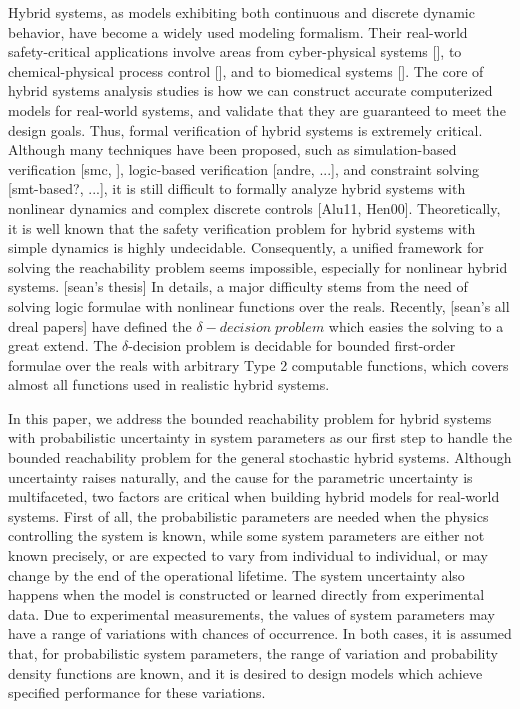 \documentclass[runningheads,a4paper]{llncs}
\begin{document}
Hybrid systems, as models exhibiting both continuous and discrete dynamic behavior, have become a widely used modeling formalism. Their real-world safety-critical applications involve areas from cyber-physical systems [], to chemical-physical process control [], and to biomedical systems []. The core of hybrid systems analysis studies is how we can construct accurate computerized models for real-world systems, and validate that they are guaranteed to meet the design goals. Thus, formal verification of hybrid systems is extremely critical. Although many techniques have been proposed, such as simulation-based verification [smc, ], logic-based verification [andre, ...], and constraint solving [smt-based?, ...], it is still difficult to formally analyze hybrid systems with nonlinear dynamics and complex discrete controls [Alu11, Hen00]. Theoretically, it is well known that the safety verification problem for hybrid systems with simple dynamics is highly undecidable. Consequently, a unified framework for solving the reachability problem seems impossible, especially for nonlinear hybrid systems. [sean's thesis] In details, a major difficulty stems from the need of solving logic formulae with nonlinear functions over the reals. Recently, [sean's all dreal papers] have defined the $\delta-decision \;  problem$ which easies the solving to a great extend. The $\delta$-decision problem is decidable for bounded first-order formulae over the reals with arbitrary Type 2 computable functions, which covers almost all functions used in realistic hybrid systems. 

In this paper, we address the bounded reachability problem for hybrid systems with probabilistic uncertainty in system parameters as our first step to handle the bounded reachability problem for the general stochastic hybrid systems. Although uncertainty raises naturally, and the cause for the parametric uncertainty is multifaceted, two factors are critical when building hybrid models for real-world systems. First of all, the probabilistic parameters are needed when the physics controlling the system is known, while some system parameters are either not known precisely, or are expected to vary from individual to individual, or may change by the end of the operational lifetime. The system uncertainty also happens when the model is constructed or learned directly from experimental data. Due to experimental measurements, the values of system parameters may have a range of variations with chances of occurrence. In both cases, it is assumed that, for probabilistic system parameters, the range of variation and probability density functions are known, and it is desired to design models which achieve specified performance for these variations. 
\end{document}
